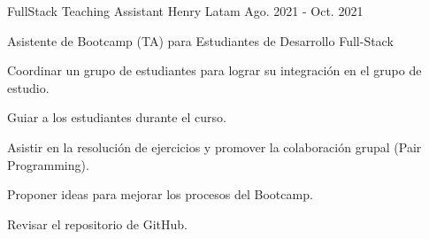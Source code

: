 \begin{cventries}
  \cventry
    {FullStack Teaching Assistant} %
    {Henry} %
    {Latam} %
    {Ago. 2021 - Oct. 2021} %
    {
      \begin{cvitems} %
        \item {Asistente de Bootcamp (TA) para Estudiantes de Desarrollo Full-Stack}
        \item {Coordinar un grupo de estudiantes para lograr su integración en el grupo de estudio.}
        \item{Guiar a los estudiantes durante el curso.}
        \item{Asistir en la resolución de ejercicios y promover la colaboración grupal (Pair Programming).}
        \item{Proponer ideas para mejorar los procesos del Bootcamp.}
        \item{Revisar el repositorio de GitHub.}
      \end{cvitems}
    }

\end{cventries}
